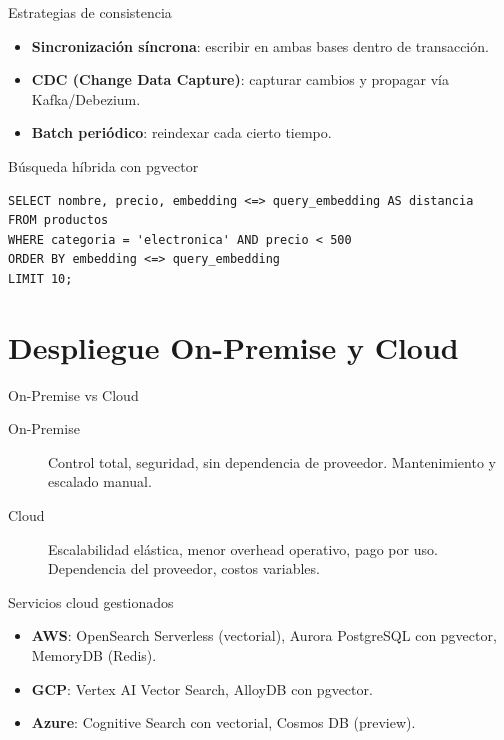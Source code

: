 \documentclass[aspectratio=169, 10pt, xcolor=table]{beamer}
\begin{document}
\begin{frame}{Estrategias de consistencia}
    \begin{itemize}
        \item \textbf{Sincronización síncrona}: escribir en ambas bases dentro de transacción.
        \item \textbf{CDC (Change Data Capture)}: capturar cambios y propagar vía Kafka/Debezium.
        \item \textbf{Batch periódico}: reindexar cada cierto tiempo.
    \end{itemize}
\end{frame}

\begin{frame}[fragile]{Búsqueda híbrida con pgvector}
    \begin{lstlisting}[style=mysql]
SELECT nombre, precio, embedding <=> query_embedding AS distancia
FROM productos
WHERE categoria = 'electronica' AND precio < 500
ORDER BY embedding <=> query_embedding
LIMIT 10;
    \end{lstlisting}
\end{frame}

\section{Despliegue On-Premise y Cloud}

\begin{frame}{On-Premise vs Cloud}
    \begin{description}
        \item[On-Premise] Control total, seguridad, sin dependencia de proveedor. Mantenimiento y escalado manual.
        \item[Cloud] Escalabilidad elástica, menor overhead operativo, pago por uso. Dependencia del proveedor, costos variables.
    \end{description}
\end{frame}

\begin{frame}{Servicios cloud gestionados}
    \begin{itemize}
        \item \textbf{AWS}: OpenSearch Serverless (vectorial), Aurora PostgreSQL con pgvector, MemoryDB (Redis).
        \item \textbf{GCP}: Vertex AI Vector Search, AlloyDB con pgvector.
        \item \textbf{Azure}: Cognitive Search con vectorial, Cosmos DB (preview).
    \end{itemize}
\end{frame}
\end{document}
